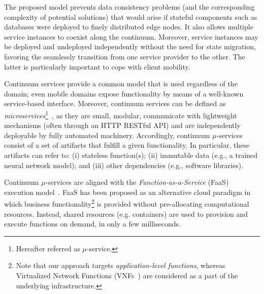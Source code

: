 The proposed model prevents data consistency problems (and the corresponding complexity of potential solutions) that would arise if stateful components such as databases were deployed to finely distributed edge nodes. It also allows multiple service instances to coexist along the continuum. Moreover, service instances may be deployed and undeployed independently without the need for state migration, favoring the seamlessly transition from one service provider to the other. The latter is particularly important to cope with client mobility.%

Continuum services provide a common model that is used regardless of the domain; even mobile domains expose functionality by means of a well-known service-based interface. 
Moreover, continuum services can be defined as \textit{microservices}\footnote{Hereafter referred as $\mu$-service.}~\cite{lewis2014microservices}, as they are small, modular, communicate with lightweight mechanisms (often through an HTTP RESTful API) and are independently deployable by fully automated machinery. Accordingly, continuum $\mu$-services consist of a set of artifacts that fulfill a given functionality. In particular, these artifacts can refer to: (i) stateless function(s); (ii) immutable data (e.g., a trained neural network model); and (iii) other dependencies (e.g., software libraries). 

Continuum $\mu$-services are aligned with the \textit{Function-as-a-Service} (FaaS) execution model~\cite{MateosFaaster17}. FaaS has been proposed as an alternative cloud paradigm in which business functionality\footnote{Note that our approach targets \textit{application-level functions}, whereas Virtualized Network Functions (VNFs~\cite{etsimec16}) are considered as a part of the underlying infrastructure.} is provided without pre-allocating computational resources. Instead, shared resources (e.g. containers) are used to provision and execute functions on demand, in only a few milliseconds. 








